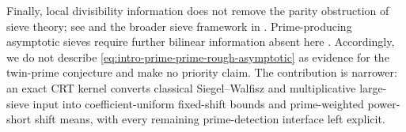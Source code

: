 Finally, local divisibility information does not remove the parity
obstruction of sieve theory; see \citet{HeathBrown1982} and the broader sieve
framework in \citet{FriedlanderIwaniec2010}.  Prime-producing asymptotic
sieves require further bilinear information absent here
\citep{FriedlanderIwaniec1998}.  Accordingly, we do not describe
\eqref{eq:intro-prime-prime-rough-asymptotic} as evidence for the twin-prime
conjecture and make no priority claim.  The contribution is narrower: an
exact CRT kernel converts classical Siegel--Walfisz and multiplicative
large-sieve input into coefficient-uniform fixed-shift bounds and
prime-weighted power-short shift means, with every remaining prime-detection
interface left explicit.
